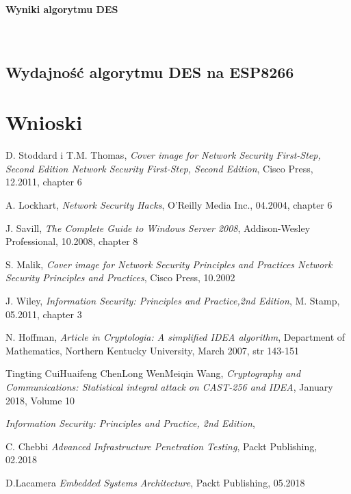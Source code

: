 \documentclass[12p]{article}
\begin{document}
\paragraph{Wyniki algorytmu DES}\mbox{} \\


\subsection{Wydajność algorytmu DES na ESP8266} 
\newpage
\section{Wnioski}


\newpage
\begin{thebibliography}{99}

 D. Stoddard i T.M. Thomas,
\emph{
Cover image for Network Security First-Step, Second Edition
Network Security First-Step, Second Edition},
Cisco Press, 12.2011, chapter 6

 A. Lockhart,
\emph{Network Security Hacks},
O'Reilly Media Inc., 04.2004, chapter 6

 J. Savill,
\emph{The Complete Guide to Windows Server 2008},
Addison-Wesley Professional, 10.2008, chapter 8

 S. Malik,
\emph{Cover image for Network Security Principles and Practices
Network Security Principles and Practices},
Cisco Press, 10.2002

 J. Wiley,
\emph{Information Security: Principles and Practice,2nd Edition},
M. Stamp, 05.2011, chapter 3

 N. Hoffman,
\emph{Article in Cryptologia: A simplified IDEA algorithm},
Department of Mathematics, Northern Kentucky University, March 2007, str 143-151

 Tingting CuiHuaifeng ChenLong WenMeiqin Wang,
\emph{Cryptography and Communications: Statistical integral attack on CAST-256 and IDEA}, January 2018, Volume 10

\emph{Information Security: Principles and Practice, 2nd Edition},

 C. Chebbi
\emph{Advanced Infrastructure Penetration Testing},
Packt Publishing, 02.2018

D.Lacamera
\emph{Embedded Systems Architecture},
Packt Publishing, 05.2018


\end{thebibliography}
\newpage
\listoffigures
{}
\end{document}

